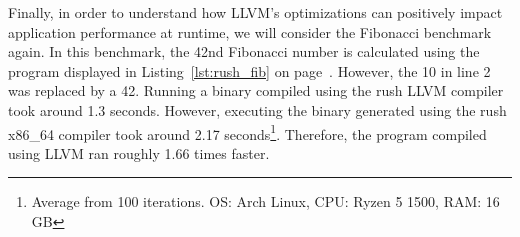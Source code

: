 Finally, in order to understand how LLVM's optimizations can positively impact application performance at runtime, we will consider the Fibonacci benchmark again.
In this benchmark, the 42nd Fibonacci number is calculated using the program displayed in Listing~\ref{lst:rush_fib} on page~\pageref{lst:rush_fib}.
However, the 10 in line 2 was replaced by a 42.
Running a binary compiled using the rush LLVM compiler took around 1.3 seconds.
However, executing the binary generated using the rush x86\_64 compiler took around 2.17 seconds\footnote{Average from 100 iterations. OS: Arch Linux, CPU: Ryzen 5 1500, RAM: 16 GB}.
Therefore, the program compiled using LLVM ran roughly 1.66 times faster.


